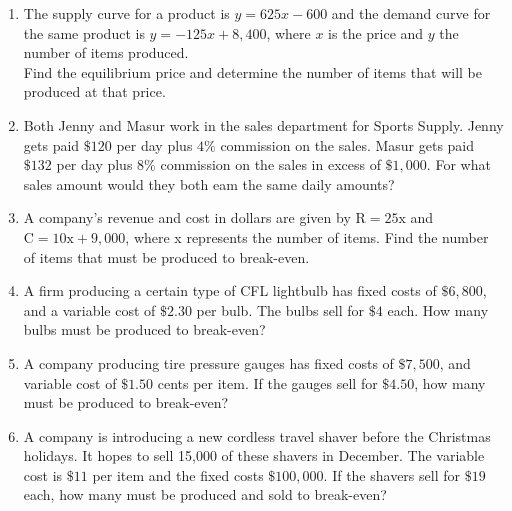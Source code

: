 \begin{enumerate}
a At a price of $\$ 10$, how many items will be in demand?\\
b. At what price will 4,000 items be supplied?\\
c. What is the equilibrium price for this product?\\
d. How many items will be manufactured at the equilibrium price?
  \item The supply curve for a product is $y=625 x-600$ and the demand curve for the same product is $y=-125 x+8,400$, where $x$ is the price and $y$ the number of items produced.\\
Find the equilibrium price and determine the number of items that will be produced at that price.
  \item Both Jenny and Masur work in the sales department for Sports Supply. Jenny gets paid $\$ 120$ per day plus $4 \%$ commission on the sales. Masur gets paid $\$ 132$ per day plus $8 \%$ commission on the sales in excess of $\$ 1,000$. For what sales amount would they both eam the same daily amounts?
  \item A company's revenue and cost in dollars are given by $\mathrm{R}=25 \mathrm{x}$ and $\mathrm{C}=10 \mathrm{x}+9,000$, where x represents the number of items. Find the number of items that must be produced to break-even.
  \item A firm producing a certain type of CFL lightbulb has fixed costs of $\$ 6,800$, and a variable cost of $\$ 2.30$ per bulb. The bulbs sell for $\$ 4$ each. How many bulbs must be produced to break-even?
  \item A company producing tire pressure gauges has fixed costs of $\$ 7,500$, and variable cost of $\$ 1.50$ cents per item. If the gauges sell for $\$ 4.50$, how many must be produced to break-even?
  \item A company is introducing a new cordless travel shaver before the Christmas holidays. It hopes to sell 15,000 of these shavers in December. The variable cost is $\$ 11$ per item and the fixed costs $\$ 100,000$. If the shavers sell for $\$ 19$ each, how many must be produced and sold to break-even?
\end{enumerate}

